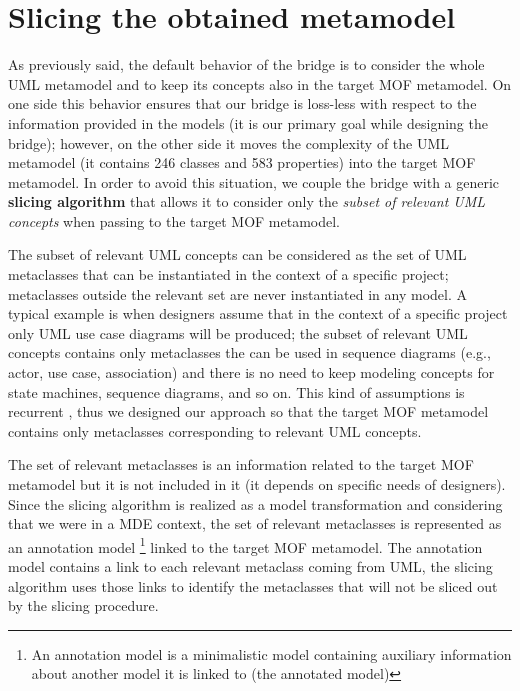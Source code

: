 \section{Slicing the obtained metamodel}\label{sec:slicing}

As previously said, the default behavior of the bridge is to consider the whole UML metamodel and to keep its concepts also in the
target MOF metamodel. On one side this behavior ensures that our bridge is loss-less with respect to the information
provided in the models (it is our primary goal while designing the bridge);
however, on the other side it moves the complexity of the UML metamodel (it contains 246 classes and 583 properties)
into the target MOF metamodel. 
In order to avoid this situation, we couple the bridge with a generic \textbf{slicing algorithm} that allows it to consider  
only the \textit{subset of relevant UML concepts} when passing to the target MOF metamodel.

The subset of relevant UML concepts can be considered as the set of UML metaclasses that can be instantiated in the context of a specific project;
metaclasses outside the relevant set are never instantiated in any model.
A typical example is when designers assume that in the context of a specific project only UML
use case diagrams will be produced; the subset of relevant UML concepts contains only metaclasses 
the can be used in sequence diagrams (e.g., actor, use case, association) and there is no need to keep modeling concepts
for state machines, sequence diagrams, and so on.
This kind of assumptions is recurrent \cite{CITAZIONI}, thus we designed our approach so that the target MOF metamodel contains only 
metaclasses corresponding to relevant UML concepts.

The set of relevant metaclasses is an information related to the target MOF metamodel but it is not included in it (it depends on specific needs of designers). 
Since the slicing algorithm is realized as a model transformation and considering that we were in a MDE context, the set of relevant
metaclasses is represented as an annotation model
\footnote{An annotation model is a minimalistic model containing auxiliary information about another model it is linked to (the annotated model)\cite{MCDFthesis}}  linked to the target MOF metamodel. The annotation model contains a link to each relevant metaclass coming from UML, the slicing algorithm uses those links to identify
the metaclasses that will not be sliced out by the slicing procedure.

